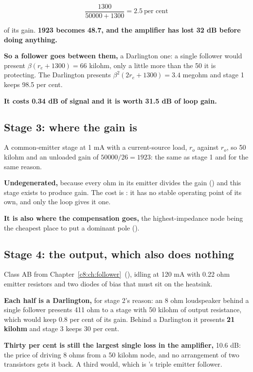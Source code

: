 \[
  \frac{1300}{50000 + 1300} = 2.5\ \text{per cent}
\]

of its gain. \textbf{1923 becomes 48.7, and the amplifier has lost 32 dB before doing anything.}

\textbf{So a follower goes between them,} a Darlington one: a single follower would present $\beta(r_e + 1300) = 66$ kilohm, only a little more than the 50 it is protecting. The Darlington presents $\beta^2(2r_e + 1300) = 3.4$ megohm and stage 1 keeps 98.5 per cent.

\textbf{It costs 0.34 dB of signal and it is worth 31.5 dB of loop gain.}

\subsection{Stage 3: where the gain is}
\label{c10:sec:a5}
A common-emitter stage at 1 mA with a current-source load, $r_o$ against $r_o$, so 50 kilohm and an unloaded gain of $50000/26 = 1923$: the same as stage 1 and for the same reason.

\textbf{Undegenerated,} because every ohm in its emitter divides the gain () and this stage exists to produce gain. The cost is : it has no stable operating point of its own, and only the loop gives it one.

\textbf{It is also where the compensation goes,} the highest-impedance node being the cheapest place to put a dominant pole ().

\subsection{Stage 4: the output, which also does nothing}
\label{c10:sec:a6}
Class AB from Chapter~\ref{c8:ch:follower}~(), idling at 120 mA with 0.22 ohm emitter resistors and two diodes of bias that must sit on the heatsink.

\textbf{Each half is a Darlington,} for stage 2's reason: an 8 ohm loudspeaker behind a single follower presents 411 ohm to a stage with 50 kilohm of output resistance, which would keep 0.8 per cent of its gain. Behind a Darlington it presents \textbf{21 kilohm} and stage 3 keeps 30 per cent.

\textbf{Thirty per cent is still the largest single loss in the amplifier,} 10.6 dB: the price of driving 8 ohms from a 50 kilohm node, and no arrangement of two transistors gets it back. A third would, which is 's triple emitter follower.


